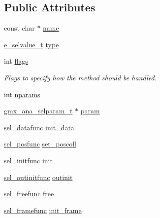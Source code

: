 \subsection*{\-Public \-Attributes}
\begin{DoxyCompactItemize}
\item 
const char $\ast$ \hyperlink{structgmx__ana__selmethod__t_a0755901dbda3e21efbd040caee67d713}{name}
\item 
\hyperlink{include_2selvalue_8h_a70b42b87d434580bf1493591857b8bec}{e\-\_\-selvalue\-\_\-t} \hyperlink{structgmx__ana__selmethod__t_a20e7d732e116b48e2caa8ad8e0ea9dd5}{type}
\item 
int \hyperlink{structgmx__ana__selmethod__t_a9ded7613b2752ddc1067766cd37af922}{flags}
\begin{DoxyCompactList}\small\item\em \-Flags to specify how the method should be handled. \end{DoxyCompactList}\item 
int \hyperlink{structgmx__ana__selmethod__t_a228c74499a9dd95033bbaa3fcda7f5e5}{nparams}
\item 
\hyperlink{structgmx__ana__selparam__t}{gmx\-\_\-ana\-\_\-selparam\-\_\-t} $\ast$ \hyperlink{structgmx__ana__selmethod__t_a1a26cbd06fbc4ab9a5744148d9af3503}{param}
\item 
\hyperlink{share_2template_2gromacs_2selmethod_8h_a5acbf2d7bead71c4d96f9e69b267df56}{sel\-\_\-datafunc} \hyperlink{structgmx__ana__selmethod__t_af844fcaa1c2be666b4a8558aa0dd31c2}{init\-\_\-data}
\item 
\hyperlink{share_2template_2gromacs_2selmethod_8h_a2b41f82c4d493740c63d148eff2129b8}{sel\-\_\-posfunc} \hyperlink{structgmx__ana__selmethod__t_a781523bb76062b89fe1ca7b4f218f4ed}{set\-\_\-poscoll}
\item 
\hyperlink{share_2template_2gromacs_2selmethod_8h_a112e5ec6891c5963a59384cf41f0cc89}{sel\-\_\-initfunc} \hyperlink{structgmx__ana__selmethod__t_ab8c8ba47a888095b9635219f488b4a0f}{init}
\item 
\hyperlink{share_2template_2gromacs_2selmethod_8h_a682279959b047d5bf8a540b00196332b}{sel\-\_\-outinitfunc} \hyperlink{structgmx__ana__selmethod__t_ab6f368546e7a0605669f6ffa9a4e1184}{outinit}
\item 
\hyperlink{share_2template_2gromacs_2selmethod_8h_a2e05a0b2274edfeab965c363f646735a}{sel\-\_\-freefunc} \hyperlink{structgmx__ana__selmethod__t_ab375b67bff103a6cb59cd2e365014a14}{free}
\item 
\hyperlink{share_2template_2gromacs_2selmethod_8h_a62eee18354ffce940f10c7dd9ff1c34b}{sel\-\_\-framefunc} \hyperlink{structgmx__ana__selmethod__t_a367958d476cfb7c4e97547fbceb078fc}{init\-\_\-frame}

\end{DoxyCompactItemize}
